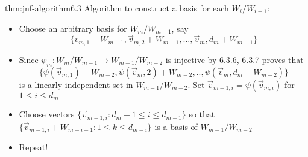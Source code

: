 \documentclass[landscape, 8pt]{extarticle}
\begin{document}
\begin{multicols}{3}
\begin{thm}{thm:jnf-algorithm}{6.3}
    Algorithm to construct a basis for each $W_{i} / W_{i - 1}$:
    \begin{itemize}[]
        \item Choose an arbitrary basis for $W_{m} / W_{m - 1}$, say
            \[\{v_{m, 1} + W_{m - 1}, \vec{v}_{m, 2} + W_{m - 1},\dots,\vec{v}_{m}, d_{m} + W_{m - 1}\}\]
        \item Since $\psi_{m} : W_{m} / W_{m - 1} \to W_{m - 1} / W_{m - 2}$ is injective by 6.3.6, 6.3.7 proves that 
            \[\{\psi(\vec{v}_{m,1}) + W_{m - 2}, \psi(\vec{v}_{m}, 2) + W_{m - 2}, . . ,\psi(\vec{v}_{m}, d_{m} + W_{m - 2})\}\]
            is a linearly independent set in $W_{m - 1} / W_{m - 2}$. Set $\vec{v}_{m - 1, i} = \psi(\vec{v}_{m, i})$ for $1 \le i \le d_{m}$
        \item Choose vectors $\{\vec{v}_{m - 1, i} : d_{m} + 1 \le i \le d_{m - 1}\}$ so that $\{\vec{v}_{m - 1, i} + W_{m - i - 1} : 1 \le k \le d_{m - i}\}$ is a basis of $W_{m - 1} / W_{m - 2}$
        \item Repeat!
    \end{itemize}
\end{thm}

\end{multicols}
\end{document}
